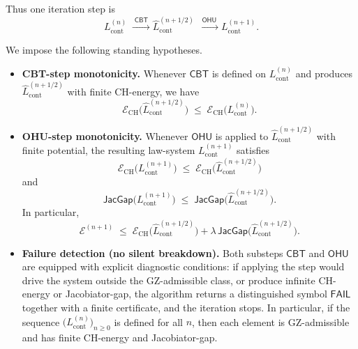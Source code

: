 \documentclass[11pt]{book}
\theoremstyle{plain}
\theoremstyle{definition}
\begin{document}
Thus one iteration step is
\[
  L_{\mathrm{cont}}^{(n)}
  \;\xrightarrow{\;\mathsf{CBT}\;}
  \widehat{L}_{\mathrm{cont}}^{(n+1/2)}
  \;\xrightarrow{\;\mathsf{OHU}\;}
  L_{\mathrm{cont}}^{(n+1)}.
\]



We impose the following standing hypotheses.

\begin{itemize}
  \item[(H1)] \textbf{CBT-step monotonicity.}
    Whenever \(\mathsf{CBT}\) is defined on
    \(L_{\mathrm{cont}}^{(n)}\) and produces
    \(\widehat{L}_{\mathrm{cont}}^{(n+1/2)}\) with finite CH-energy,
    we have
    \[
      \mathcal{E}_{\mathrm{CH}}\bigl(
        \widehat{L}_{\mathrm{cont}}^{(n+1/2)}
      \bigr)
      \;\le\;
      \mathcal{E}_{\mathrm{CH}}\bigl(
        L_{\mathrm{cont}}^{(n)}
      \bigr).
    \]
  \item[(H2)] \textbf{OHU-step monotonicity.}
    Whenever \(\mathsf{OHU}\) is applied to
    \(\widehat{L}_{\mathrm{cont}}^{(n+1/2)}\) with finite potential,
    the resulting law-system \(L_{\mathrm{cont}}^{(n+1)}\) satisfies
    \[
      \mathcal{E}_{\mathrm{CH}}\bigl(
        L_{\mathrm{cont}}^{(n+1)}
      \bigr)
      \;\le\;
      \mathcal{E}_{\mathrm{CH}}\bigl(
        \widehat{L}_{\mathrm{cont}}^{(n+1/2)}
      \bigr)
    \]
    and
    \[
      \mathsf{JacGap}\bigl(
        L_{\mathrm{cont}}^{(n+1)}
      \bigr)
      \;\le\;
      \mathsf{JacGap}\bigl(
        \widehat{L}_{\mathrm{cont}}^{(n+1/2)}
      \bigr).
    \]
    In particular,
    \[
      \mathcal{E}^{(n+1)}
      \;\le\;
      \mathcal{E}_{\mathrm{CH}}\bigl(
        \widehat{L}_{\mathrm{cont}}^{(n+1/2)}
      \bigr)
      +
      \lambda\,\mathsf{JacGap}\bigl(
        \widehat{L}_{\mathrm{cont}}^{(n+1/2)}
      \bigr).
    \]
  \item[(H3)] \textbf{Failure detection (no silent breakdown).}
    Both substeps \(\mathsf{CBT}\) and \(\mathsf{OHU}\) are equipped
    with explicit diagnostic conditions: if applying the step would
    drive the system outside the GZ-admissible class, or produce
    infinite CH-energy or Jacobiator-gap, the algorithm returns a
    distinguished symbol \(\mathsf{FAIL}\) together with a finite
    certificate, and the iteration stops.  In particular, if the
    sequence \(\bigl(L_{\mathrm{cont}}^{(n)}\bigr)_{n\ge 0}\) is
    defined for all \(n\), then each element is GZ-admissible and has
    finite CH-energy and Jacobiator-gap.
\end{itemize}
\end{document}
